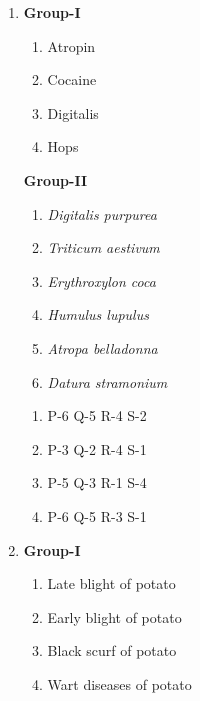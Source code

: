 \documentclass[journal,12pt,onecolumn]{IEEEtran}
\begin{document}
\begin{enumerate}
\begin{multicols}{2}
\begin{enumerate}[label=(\Alph*)]
    \item P-5 Q-2 R-3 S-4
    \item P-3 Q-1 R-4 S-6
    \item P-3 Q-6 R-3 S-2
    \item P-4 Q-5 R-2 S-1
\end{enumerate}
\end{multicols}

\item
\begin{multicols}{2}
\textbf{Group-I}
\begin{enumerate}[label=(\Alph*) ,start=16]
    \item Atropin
    \item Cocaine
    \item Digitalis
    \item Hops
\end{enumerate}

\columnbreak

\textbf{Group-II}
\begin{enumerate}[label=\arabic*.]
    \item \textit{Digitalis purpurea}
    \item \textit{Triticum aestivum}
    \item \textit{Erythroxylon coca}
    \item \textit{Humulus lupulus}
    \item \textit{Atropa belladonna}
    \item \textit{Datura stramonium}
\end{enumerate}
\end{multicols}

\begin{multicols}{2}
\begin{enumerate}[label=(\Alph*)]
    \item P-6 Q-5 R-4 S-2
    \item P-3 Q-2 R-4 S-1
    \item P-5 Q-3 R-1 S-4
    \item P-6 Q-5 R-3 S-1
\end{enumerate}
\end{multicols}

\item
\begin{multicols}{2}
\textbf{Group-I}
\begin{enumerate}[label=(\Alph*) ,start=16]
    \item Late blight of potato
    \item Early blight of potato
    \item Black scurf of potato
    \item Wart diseases of potato
\end{enumerate}


\end{multicols}
\end{enumerate}
\end{document}
